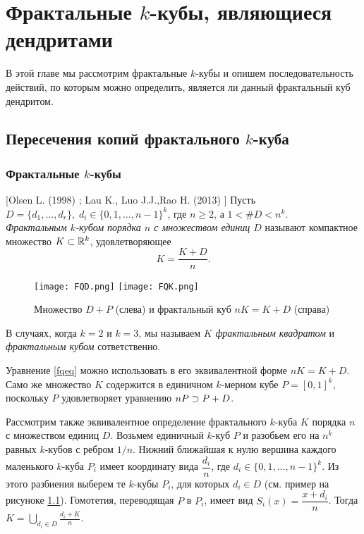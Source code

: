 \newpage
\chapter{Фрактальные $k$-кубы, являющиеся дендритами}

В этой главе мы рассмотрим фрактальные $k$-кубы и опишем последовательность действий, по которым можно определить, является ли данный фрактальный куб дендритом.


\section{Пересечения копий фрактального $k$-куба}


\subsection{Фрактальные $k$-кубы}

\begin{definition}\label{dfn:FQ} 
[Olsen L. (1998) \cite{Olsen1998}; Lau K., Luo J.J.,Rao H. (2013) \cite{LLR2013}]
Пусть  $D=\{d_1,\ldots,d_r\},\; d_i\in\{0,1,\ldots,n-1\}^k$, где $n\ge 2$, а $1<\#D<n^k$.\\
{\em Фрактальным $k$-кубом порядка $n$ с множеством единиц $D$} называют компактное множество $K\subset\mathbb{R}^k$, удовлетворяющее 
\begin{equation}\label{fqeq}
K=\dfrac{K+D}{n}.
\end{equation}
\end{definition}

\begin{figure}[h!]
    \centering
    \qquad
    \texttt{[image: FQD.png]}
    \hfill
    \texttt{[image: FQK.png]}
    \qquad
    \caption{Множество $D+P$ (слева) и фрактальный куб $nK=K+D$ (справа)}
    \label{fig:FQ}
\end{figure}

В случаях, когда $k=2$ и $k=3$, мы называем $K$ \emph{фрактальным квадратом} и \emph{фрактальным кубом} сответственно.

Уравнение \eqref{fqeq} можно использовать в его эквивалентной форме $nK=K+D$.
Само же множество $K$ содержится в единичном $k$-мерном кубе $P=[0,1]^k$, поскольку $P$ удовлетворяет уравнению $nP\supset P+D$.

Рассмотрим также эквивалентное определение фрактального $k$-куба $K$ порядка $n$ с множеством единиц $D$.
Возьмем единичный $k$-куб $P$ и разобьем его на $n^k$ равных $k$-кубов с ребром $1/n$.
Нижний ближайшая к нулю вершина каждого маленького $k$-куба $P_i$ имеет координату вида $\dfrac{d_i}{n}$, где $d_i\in\{0,1,\ldots,n-1\}^k$.
Из этого разбиения выберем те $k$-кубы $P_i$, для которых $d_i\in D$ (см. пример на рисуноке \ref{fig:FQ}).
Гомотетия, переводящая $P$ в $P_i$, имеет вид $S_i(x)=\dfrac{x+d_i}{n}$.
Тогда $K=\bigcup\limits_{d_i\in D}\frac{d_i+K}{n}$.

